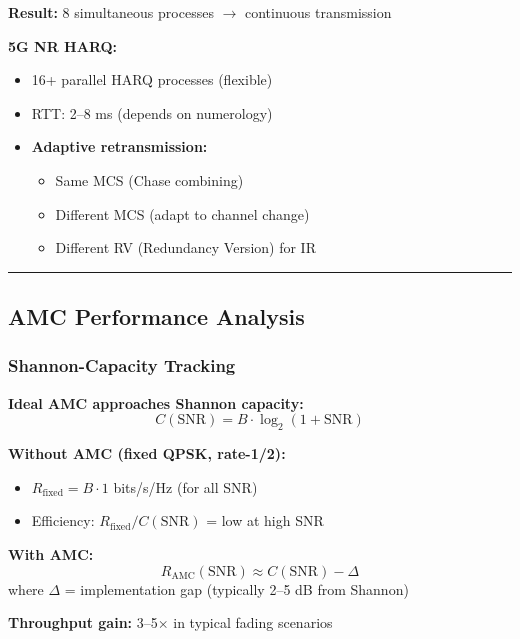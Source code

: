 \textbf{Result:} 8 simultaneous processes $\rightarrow$ continuous transmission

\textbf{5G NR HARQ:}
\begin{itemize}
\item 16+ parallel HARQ processes (flexible)
\item RTT: 2--8 ms (depends on numerology)
\item \textbf{Adaptive retransmission:}
  \begin{itemize}
  \item Same MCS (Chase combining)
  \item Different MCS (adapt to channel change)
  \item Different RV (Redundancy Version) for IR
  \end{itemize}
\end{itemize}

\begin{center}\rule{0.5\linewidth}{0.5pt}\end{center}

\subsection{AMC Performance Analysis}\label{amc-performance-analysis}

\subsubsection{Shannon-Capacity
Tracking}\label{shannon-capacity-tracking}

\textbf{Ideal AMC approaches Shannon capacity:}
\begin{equation*}
C(\text{SNR}) = B \cdot \log_2(1 + \text{SNR})
\end{equation*}

\textbf{Without AMC (fixed QPSK, rate-1/2):}
\begin{itemize}
\item $R_{\text{fixed}} = B \cdot 1$ bits/s/Hz (for all SNR)
\item Efficiency: $R_{\text{fixed}} / C(\text{SNR})$ = low at high SNR
\end{itemize}

\textbf{With AMC:}
\begin{equation*}
R_{\text{AMC}}(\text{SNR}) \approx C(\text{SNR}) - \Delta
\end{equation*}
where $\Delta$ = implementation gap (typically 2--5 dB from Shannon)

\textbf{Throughput gain:} 3--5$\times$ in typical fading scenarios

